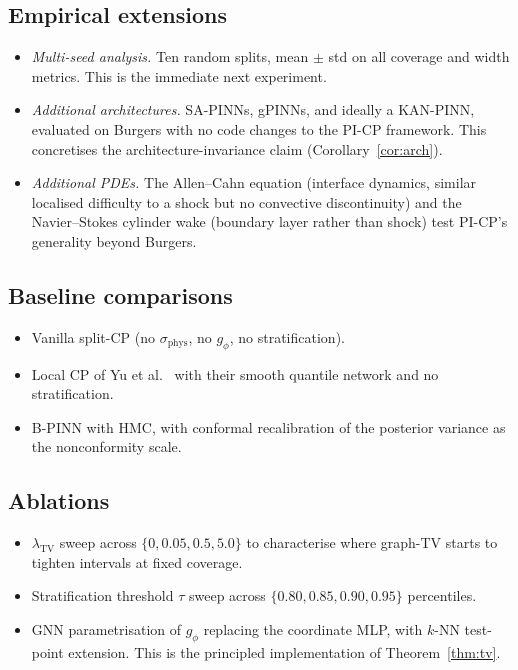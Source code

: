 \documentclass[11pt]{article}
\theoremstyle{definition}
\theoremstyle{remark}
\newcommand{\sphys}{\sigma_{\mathrm{phys}}}
\newcommand{\TV}{\mathrm{TV}}
\begin{document}
\subsection{Empirical extensions}

\begin{itemize}[leftmargin=*,topsep=2pt,itemsep=2pt]
    \item \emph{Multi-seed analysis.} Ten random splits, mean $\pm$ std on all coverage and width metrics. This is the immediate next experiment.
    \item \emph{Additional architectures.} SA-PINNs, gPINNs, and ideally a KAN-PINN, evaluated on Burgers with no code changes to the PI-CP framework. This concretises the architecture-invariance claim (Corollary~\ref{cor:arch}).
    \item \emph{Additional PDEs.} The Allen--Cahn equation (interface dynamics, similar localised difficulty to a shock but no convective discontinuity) and the Navier--Stokes cylinder wake (boundary layer rather than shock) test PI-CP's generality beyond Burgers.
\end{itemize}

\subsection{Baseline comparisons}

\begin{itemize}[leftmargin=*,topsep=2pt,itemsep=2pt]
    \item Vanilla split-CP (no $\sphys$, no $g_\phi$, no stratification).
    \item Local CP of Yu et al.~\cite{yu2025cp} with their smooth quantile network and no stratification.
    \item B-PINN with HMC, with conformal recalibration of the posterior variance as the nonconformity scale.
\end{itemize}

\subsection{Ablations}

\begin{itemize}[leftmargin=*,topsep=2pt,itemsep=2pt]
    \item $\lambda_{\TV}$ sweep across $\{0, 0.05, 0.5, 5.0\}$ to characterise where graph-TV starts to tighten intervals at fixed coverage.
    \item Stratification threshold $\tau$ sweep across $\{0.80, 0.85, 0.90, 0.95\}$ percentiles.
    \item GNN parametrisation of $g_\phi$ replacing the coordinate MLP, with $k$-NN test-point extension. This is the principled implementation of Theorem~\ref{thm:tv}.
\end{itemize}
\end{document}
